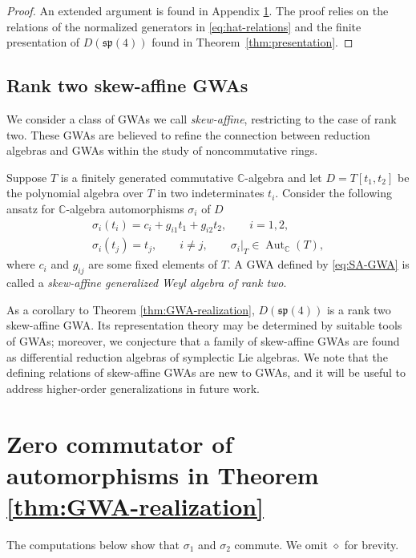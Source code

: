 \documentclass[10pt,a4paper]{amsart}
\numberwithin{equation}{section}
\DeclareMathOperator{\Aut}{Aut}
\begin{document}
\begin{proof}
	An extended argument is found in Appendix \ref{Appendix:sec:Zero-Commutator}. The proof relies on the relations of the normalized generators in \eqref{eq:hat-relations} and the finite presentation of $D(\mathfrak{sp}(4))$ found in Theorem~\ref{thm:presentation}.
\end{proof}


\subsection{Rank two skew-affine GWAs}\label{subsec:GWA-skew-affine}
We consider a class of GWAs we call \emph{skew-affine}, restricting to the case of rank two. These GWAs are believed to refine the connection \cite{vandenhomberghNoteMickelssonStep1975} between reduction algebras and GWAs within the study of noncommutative rings.

\begin{Definition}\label{def:SA-GWArank2}
	Suppose $T$ is a finitely generated commutative $\mathbb{C}$-algebra and let $D=T[t_1,t_2]$ be the polynomial algebra over $T$ in two indeterminates $t_i$. Consider the following ansatz for $\mathbb{C}$-algebra automorphisms $\sigma_i$ of $D$
	\begin{gather}\label{eq:SA-GWA}
		\sigma_i(t_i)=c_i+g_{i1}t_1+g_{i2}t_2,\qquad i=1,2,\\
		\sigma_i(t_j)=t_j,\qquad i\neq j,\qquad
		\sigma_i|_T\in\Aut_\mathbb{C}(T),\nonumber
	\end{gather}
	where $c_i$ and $g_{ij}$ are some fixed elements of $T$. A GWA defined by \eqref{eq:SA-GWA} is called a \emph{skew-affine generalized Weyl algebra of rank two}.
\end{Definition}


As a corollary to Theorem \ref{thm:GWA-realization}, $D(\mathfrak{sp}(4))$ is a rank two skew-affine GWA. Its representation theory may be determined by suitable tools of GWAs; moreover, we conjecture that a family of skew-affine GWAs are found as differential reduction algebras of symplectic Lie algebras. We note that the defining relations of skew-affine GWAs are new to GWAs, and it will be useful to address higher-order generalizations in future work.

\appendix


\section[Zero commutator of automorphisms in Theorem 4.6]{Zero commutator of automorphisms in Theorem \ref{thm:GWA-realization}}\label{Appendix:sec:Zero-Commutator}
The computations below show that $\sigma_{1}$ and $\sigma_{2}$ commute.
We omit $\diamond$ for brevity.
\end{document}
